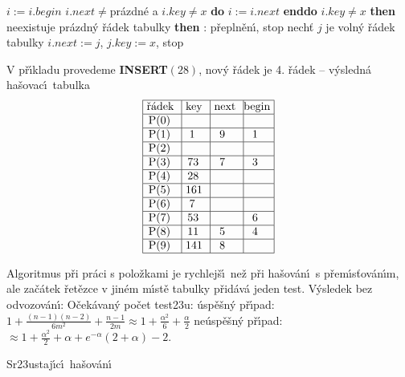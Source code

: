 \phantom{---}$i:=i.begin$
\phantom{---}{\bf while} $i.next\ne$pr\'azdn\'e a $i.key\ne x$ {\bf do} $i:=i.next$ {\bf enddo}\newline 
\phantom{---}{\bf if} $i.key\ne x$ {\bf then}\newline 
\phantom{------}{\bf if} neexistuje pr\'azdn\'y \v r\'adek tabulky {\bf then}\newline 
\phantom{---------}{\bf V\'ystup}: p\v repln\v en\'\i , stop\newline 
\phantom{------}{\bf else}\newline 
\phantom{---------}nech\v t $j$ je voln\'y \v r\'adek tabulky\newline 
\phantom{---------}$i.next:=j$, $j.key:=x$, stop\newline 
\phantom{------}{\bf endif}\newline
\phantom{---}{\bf endif\newline 
endif}
\bigskip

\flushpar V p\v r\'\i kladu provedeme {\bf INSERT$\left(28\right)$}, nov\'y \v r\'adek je 4. 
\v r\'adek\newline 
-- v\'ysledn\'a ha\v sovac\'\i\ tabulka
$$\vtop{\offinterlineskip\halign {\strut\vrule\ # & \vrule\ # & \vrule\ # & \vrule \hfil # \hfil \vrule\cr\noalign{\hrule}\v r\'adek & key & next & begin\hfil \cr\noalign{\hrule}P(0) & & &\hfill \cr\noalign{\hrule}P(1) & 1 & 9 & 1 \cr\noalign{\hrule}P(2) & & &\hfill \cr\noalign{\hrule}P(3) & 73 & 7 & 3 \cr\noalign{\hrule}P(4) & 28 &  &\hfill \cr\noalign{\hrule}P(5) & 161 & & \hfill \cr\noalign{\hrule}P(6) & 7 & &\hfill \cr\noalign{\hrule}P(7) & 53 & & 6 \cr\noalign{\hrule}P(8) & 11 & 5 & 4  \cr\noalign{\hrule}P(9) & 141 & 8 & \hfill \cr\noalign{\hrule}}}$$

\flushpar Algoritmus p\v ri pr\'aci s polo\v zkami je rychlej\v s\'\i\ ne\v z p\v ri 
ha\v sov\'an\'\i\ s p\v rem\'\i s\v tov\'an\'\i m, ale za\v c\'atek \v ret\v ezce v 
jin\'em m\'\i st\v e tabulky p\v rid\'av\'a jeden test. V\'ysledek bez 
odvozov\'an\'\i :\newline 
O\v cek\'avan\'y po\v cet test\accent23u:\newline 
\phantom{---}\'usp\v e\v sn\'y p\v r\'\i pad: $1+\frac {\left(n-1\right)\left(n-2\right)}{6m^2}+\frac {
n-1}{2m}\approx 1+\frac {\alpha^2}6+\frac {\alpha}2$\newline 
\phantom{---}ne\'usp\v e\v sn\'y p\v r\'\i pad: $\approx 1+\frac {\alpha^2}2+\alpha 
+e^{-\alpha}\left(2+\alpha \right)-2$.

\heading
Sr\accent23ustaj\'\i c\'\i\ ha\v sov\'an\'\i
\endheading

